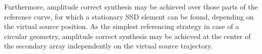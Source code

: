 Furthermore, amplitude correct synthesis may be achieved over those parts of the reference curve, for which a stationary SSD element can be found, depending on the virtual source position.
As the simplest referencing strategy in case of a circular geometry, amplitude correct synthesis may be achieved at the center of the secondary array independently on the virtual source trajectory.


